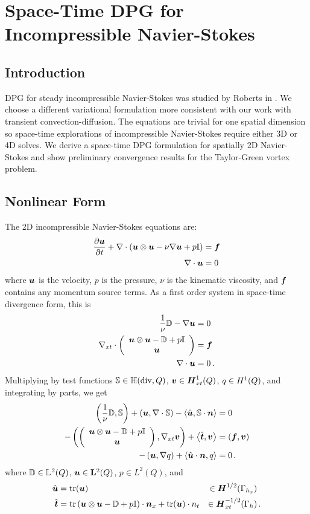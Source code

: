 \documentclass[Dissertation.tex]{subbIles}
\begin{document}
\graphicspath{{../Figures/}}
\chapter{Space-Time DPG for Incompressible Navier-Stokes}
\label{sec:incompressible}

\section{Introduction}
DPG for steady incompressible Navier-Stokes was studied by Roberts in \cite{NateDissertation}.
We choose a different variational formulation more consistent with 
our work with transient convection-diffusion.
The equations are trivial for one spatial dimension so space-time explorations of incompressible
Navier-Stokes require either 3D or 4D solves.
We derive a space-time DPG formulation for spatially 2D Navier-Stokes and show preliminary 
convergence results for the Taylor-Green vortex problem.

\section{Nonlinear Form}
The 2D incompressible Navier-Stokes equations are:
\begin{align*}
  \frac{\partial\boldsymbol u}{\partial t}+\nabla\cdot\left( \boldsymbol u\otimes\boldsymbol u-\nu\nabla\boldsymbol u+p\mathbb{I} \right)&=\boldsymbol f\\
  \nabla\cdot\boldsymbol u&=0
\end{align*}
where $\boldsymbol u$ is the velocity, $p$ is the pressure, $\nu$ is the kinematic viscosity,
and $\boldsymbol f$ contains any momentum source terms.
As a first order system in space-time divergence form, this is
\begin{align*}
  \frac{1}{\nu}\mathbb{D}-\nabla\boldsymbol u&=0\\
  \nabla_{xt}\cdot\left( \begin{array}{c} \boldsymbol u\otimes\boldsymbol u-\mathbb{D}+p\mathbb{I}\\ \boldsymbol u\\ \end{array} \right)&=\boldsymbol f\\
  \nabla\cdot\boldsymbol u&=0\,.
\end{align*}
Multiplying by test functions $\mathbb{S}\in\mathbb{H}(\text{div},Q)$, $\boldsymbol v\in\mbox{\boldmath $H$}^1_{xt}(Q)$, $q\in H^{1}(Q)$, 
and integrating by parts, we get
\begin{align*}
  \left( \frac{1}{\nu}\mathbb{D},\mathbb{S} \right)
  +\left( \boldsymbol u,\nabla\cdot\mathbb{S} \right)
  -\left\langle \hat{\boldsymbol u},\mathbb{S}\cdot\boldsymbol n \right\rangle&=0\\
  -\left( \left( \begin{array}{c} \boldsymbol u\otimes\boldsymbol u-\mathbb{D}+p\mathbb{I}\\ \boldsymbol u\\ \end{array} \right),\nabla_{xt}\boldsymbol v \right)
  +\left\langle \hat{\boldsymbol t},\boldsymbol v \right\rangle
  &=(\boldsymbol f,\boldsymbol v)\\
  -\left( \boldsymbol u,\nabla q \right)
  +\left\langle \hat{\boldsymbol u}\cdot\boldsymbol n,q \right\rangle&=0\,.
\end{align*}
where $\mathbb{D}\in\mathbb{L}^2(Q)$, $\boldsymbol u\in\mathbf{L}^2(Q)$, $p\in L^2(Q)$, and
\begin{align*}
\hat{\boldsymbol u}&=\operatorname*{tr}(\boldsymbol u)&\in \mbox{\boldmath $H$}^{1/2}(\Gamma_{h_x})&\\
\hat{\boldsymbol t}&=\operatorname*{tr}\left( \boldsymbol u\otimes\boldsymbol u-\mathbb{D}+p\mathbb{I} \right)\cdot\boldsymbol n_x
+\operatorname*{tr}(\boldsymbol u)\cdot n_t&\in \mbox{\boldmath $H$}^{-1/2}_{xt}(\Gamma_h)&\,.
\end{align*}
\end{document}
